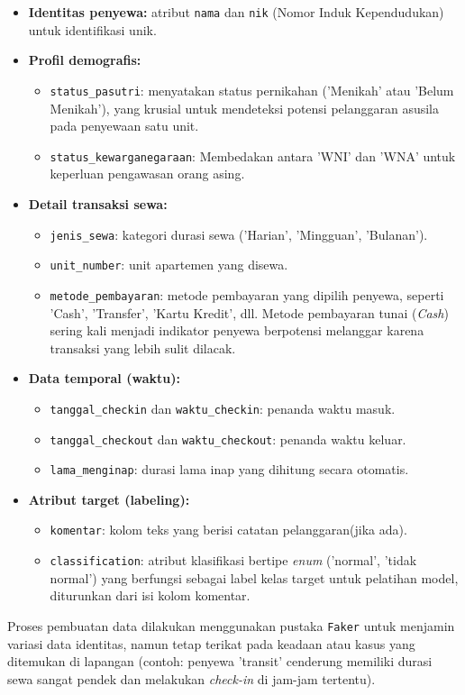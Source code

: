 \begin{itemize}
    \item \textbf{Identitas penyewa:} atribut \texttt{nama} dan \texttt{nik} (Nomor Induk Kependudukan) untuk identifikasi unik.
    \item \textbf{Profil demografis:}
    \begin{itemize}
        \item \texttt{status\_pasutri}: menyatakan status pernikahan ('Menikah' atau 'Belum Menikah'), yang krusial untuk mendeteksi potensi pelanggaran asusila pada penyewaan satu unit.
        \item \texttt{status\_kewarganegaraan}: Membedakan antara 'WNI' dan 'WNA' untuk keperluan pengawasan orang asing.
    \end{itemize}
    \item \textbf{Detail transaksi sewa:}
    \begin{itemize}
        \item \texttt{jenis\_sewa}: kategori durasi sewa ('Harian', 'Mingguan', 'Bulanan').
        \item \texttt{unit\_number}: unit apartemen yang disewa.
        \item \texttt{metode\_pembayaran}: metode pembayaran yang dipilih penyewa, seperti 'Cash', 'Transfer', 'Kartu Kredit', dll. Metode pembayaran tunai (\textit{Cash}) sering kali menjadi indikator penyewa berpotensi melanggar karena transaksi yang lebih sulit dilacak.
    \end{itemize}
    \item \textbf{Data temporal (waktu):}
    \begin{itemize}
        \item \texttt{tanggal\_checkin} dan \texttt{waktu\_checkin}: penanda waktu masuk.
        \item \texttt{tanggal\_checkout} dan \texttt{waktu\_checkout}: penanda waktu keluar.
        \item \texttt{lama\_menginap}: durasi lama inap yang dihitung secara otomatis.
    \end{itemize}
    \item \textbf{Atribut target (labeling):}
    \begin{itemize}
        \item \texttt{komentar}: kolom teks yang berisi catatan pelanggaran(jika ada). 
        \item \texttt{classification}: atribut klasifikasi bertipe \textit{enum} ('normal', 'tidak normal') yang berfungsi sebagai label kelas target untuk pelatihan model, diturunkan dari isi kolom komentar.
    \end{itemize}
\end{itemize}

Proses pembuatan data dilakukan menggunakan pustaka \texttt{Faker} untuk menjamin variasi data identitas, namun tetap terikat pada keadaan atau kasus yang ditemukan di lapangan (contoh: penyewa 'transit' cenderung memiliki durasi sewa sangat pendek dan melakukan \textit{check-in} di jam-jam tertentu).
